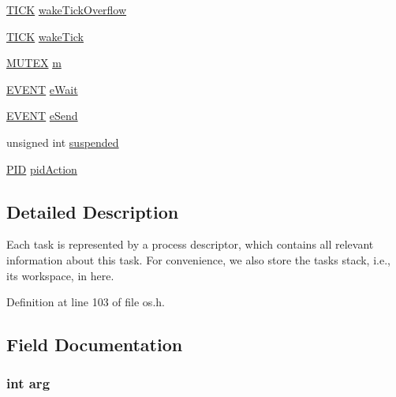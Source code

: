\begin{DoxyCompactItemize}
\hyperlink{os_8h_a8cc02cda8b6aacf20b067a28103f1e1a}{T\+I\+CK} \hyperlink{struct_process_descriptor_ab542ea7817e429d975a24a2c5b7d39c6}{wake\+Tick\+Overflow}
\item 
\hyperlink{os_8h_a8cc02cda8b6aacf20b067a28103f1e1a}{T\+I\+CK} \hyperlink{struct_process_descriptor_ad3dc3420729bd1d10e0aaa2bd7b06da8}{wake\+Tick}
\item 
\hyperlink{os_8h_ad50a579691fc8233e549f1b355ef96b3}{M\+U\+T\+EX} \hyperlink{struct_process_descriptor_a83f1cf80c5086c88b4faec56356500d8}{m}
\item 
\hyperlink{os_8h_a3b95dbfce5db28a04d9387963a3f3708}{E\+V\+E\+NT} \hyperlink{struct_process_descriptor_a2a1358792377e75f63647a13807dca28}{e\+Wait}
\item 
\hyperlink{os_8h_a3b95dbfce5db28a04d9387963a3f3708}{E\+V\+E\+NT} \hyperlink{struct_process_descriptor_a8898b772412b68106f44973c695b8947}{e\+Send}
\item 
unsigned int \hyperlink{struct_process_descriptor_a2862ffde11c780129862e5549415a6f6}{suspended}
\item 
\hyperlink{os_8h_aa4f4d03691545cda70a42801c8b9096b}{P\+ID} \hyperlink{struct_process_descriptor_ad84921ad5eb476c43e24d25db3e5865d}{pid\+Action}
\end{DoxyCompactItemize}


\subsection{Detailed Description}
Each task is represented by a process descriptor, which contains all relevant information about this task. For convenience, we also store the task\textquotesingle{}s stack, i.\+e., its workspace, in here. 

Definition at line 103 of file os.\+h.



\subsection{Field Documentation}
\subsubsection[{\texorpdfstring{arg}{arg}}]{\setlength{\rightskip}{0pt plus 5cm}int arg}\hypertarget{struct_process_descriptor_af09bff4320de23f28f0d261c3b124d6b}{}\label{struct_process_descriptor_af09bff4320de23f28f0d261c3b124d6b}


